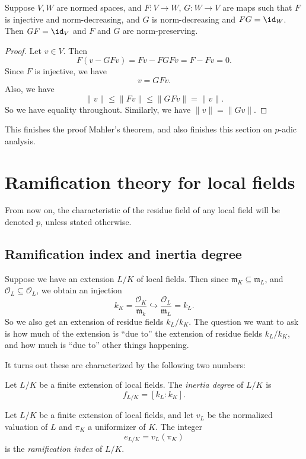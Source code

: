 \documentclass[a4paper]{article}
\begin{document}
\begin{lemma}
  Suppose $V, W$ are normed spaces, and $F: V \to W$, $G: W \to V$ are maps such that $F$ is injective and norm-decreasing, and $G$ is norm-decreasing and $FG = \id_W$. Then $GF = \id_V$ and $F$ and $G$ are norm-preserving.
\end{lemma}

\begin{proof}
  Let $v \in V$. Then
  \[
    F(v - GFv) = Fv - FGF v = F - Fv = 0.
  \]
  Since $F$ is injective, we have
  \[
    v = GF v.
  \]
  Also, we have
  \[
    \|v\| \leq \|Fv\| \leq \|GFv\| = \|v\|.
  \]
  So we have equality throughout. Similarly, we have $\|v\| = \|Gv\|$.
\end{proof}
This finishes the proof Mahler's theorem, and also finishes this section on $p$-adic analysis.

\section{Ramification theory for local fields}
From now on, the characteristic of the residue field of any local field will be denoted $p$, unless stated otherwise.

\subsection{Ramification index and inertia degree}
Suppose we have an extension $L/K$ of local fields. Then since $\mathfrak{m}_K \subseteq \mathfrak{m}_L$, and $\mathcal{O}_L \subseteq \mathcal{O}_L$, we obtain an injection
\[
  k_K = \frac{\mathcal{O}_K}{\mathfrak{m}_k} \hookrightarrow \frac{\mathcal{O}_L}{\mathfrak{m}_L} = k_L.
\]
So we also get an extension of residue fields $k_L/k_K$. The question we want to ask is how much of the extension is ``due to'' the extension of residue fields $k_L/k_K$, and how much is ``due to'' other things happening.

It turns out these are characterized by the following two numbers:
\begin{defi}
  Let $L/K$ be a finite extension of local fields. The \emph{inertia degree} of $L/K$ is
  \[
    f_{L/K} = [k_L:k_K].
  \]
\end{defi}

\begin{defi}
  Let $L/K$ be a finite extension of local fields, and let $v_L$ be the normalized valuation of $L$ and $\pi_K$ a uniformizer of $K$. The integer
  \[
    e_{L/K} = v_L(\pi_K)
  \]
  is the \emph{ramification index} of $L/K$.
\end{defi}
\end{document}
